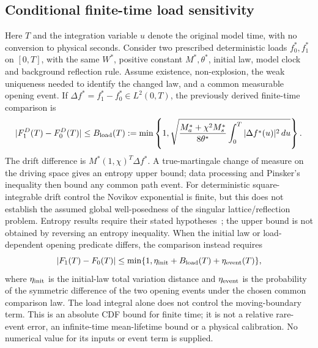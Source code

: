 \documentclass[11pt]{article}
\begin{document}
\subsection{Conditional finite-time load sensitivity}
Here $T$ and the integration variable $u$ denote the original model time,
with no conversion to physical seconds.
Consider two prescribed deterministic loads $f_0^*,f_1^*$ on $[0,T]$,
with the same $W^*$, positive constant $M^*,\theta^*$, initial law,
model clock and background reflection rule. Assume existence, non-explosion,
the weak uniqueness needed to identify the changed law, and a common measurable
opening event. If $\Delta f^*=f_1^*-f_0^*\in L^2(0,T)$, the previously
derived finite-time comparison is
\begin{equation}
 |F_1^D(T)-F_0^D(T)|\leq B_{\rm load}(T)
 :=\min\left\{1,\sqrt{\frac{M_a^*+\chi^2M_s^*}{8\theta^*}
 \int_0^T |\Delta f^*(u)|^2\,du}\right\}.
\end{equation}
The drift difference is $M^*(1,\chi)^T\Delta f^*$. A true-martingale
change of measure on the driving space gives an entropy upper bound;
data processing and Pinsker's inequality then bound any common path event.
For deterministic square-integrable drift control the Novikov exponential
is finite, but this does not establish the assumed global well-posedness of
the singular lattice/reflection problem. Entropy results require their
stated hypotheses~\cite{Leonard2012,Lehec2025}; the upper bound is not
obtained by reversing an entropy inequality.
When the initial law or load-dependent opening predicate differs, the
comparison instead requires
\begin{equation}
 |F_1(T)-F_0(T)|\leq
 \min\{1,\eta_{\rm init}+B_{\rm load}(T)+\eta_{\rm event}(T)\},
\end{equation}
where $\eta_{\rm init}$ is the initial-law total variation distance and
$\eta_{\rm event}$ is the probability of the symmetric difference of the
two opening events under the chosen common comparison law.
The load integral alone does not control the moving-boundary term.
This is an absolute CDF bound for finite time; it is not a relative rare-event
error, an infinite-time mean-lifetime bound or a physical calibration.
No numerical value for its inputs or event term is supplied.
\end{document}
